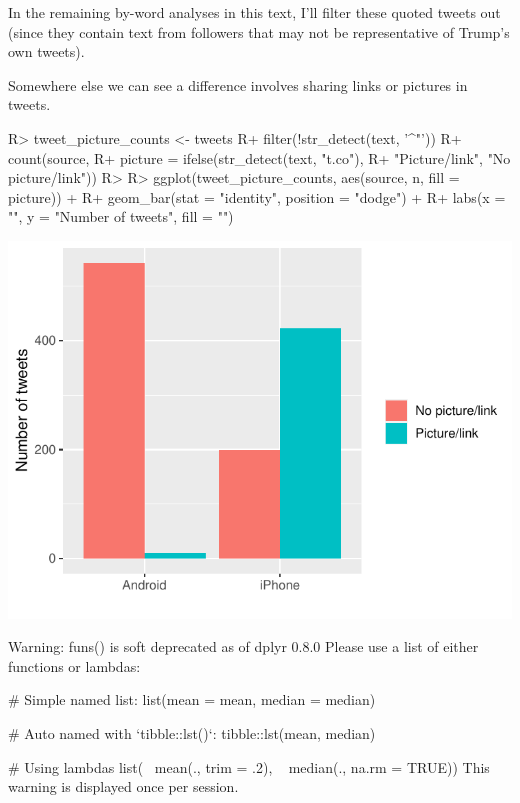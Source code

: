 \documentclass[
]{jss}
\begin{document}
In the remaining by-word analyses in this text, I'll filter these quoted
tweets out (since they contain text from followers that may not be
representative of Trump's own tweets).

Somewhere else we can see a difference involves sharing links or
pictures in tweets.

\begin{CodeChunk}

\begin{CodeInput}
R> tweet_picture_counts <- tweets %
R+   filter(!str_detect(text, '^"')) %
R+   count(source,
R+         picture = ifelse(str_detect(text, "t.co"),
R+                          "Picture/link", "No picture/link"))
R> 
R> ggplot(tweet_picture_counts, aes(source, n, fill = picture)) +
R+   geom_bar(stat = "identity", position = "dodge") +
R+   labs(x = "", y = "Number of tweets", fill = "")
\end{CodeInput}


\begin{center}\includegraphics{Live_Demo2_files/figure-latex/unnamed-chunk-4-1} \end{center}

\end{CodeChunk}

\begin{CodeChunk}

\begin{CodeOutput}
Warning: funs() is soft deprecated as of dplyr 0.8.0
Please use a list of either functions or lambdas: 

  # Simple named list: 
  list(mean = mean, median = median)

  # Auto named with `tibble::lst()`: 
  tibble::lst(mean, median)

  # Using lambdas
  list(~ mean(., trim = .2), ~ median(., na.rm = TRUE))
This warning is displayed once per session.
\end{CodeOutput}
\end{CodeChunk}
\end{document}
